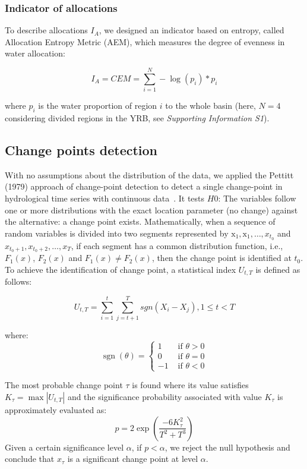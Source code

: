 \documentclass[draft]{../agujournal2019}
\begin{document}
	\subsubsection*{Indicator of allocations}
	To describe allocations $I_A$, we designed an indicator based on entropy, called Allocation Entropy Metric (AEM), which measures the degree of evenness in water allocation:

	\begin{equation}
		I_A = CEM = \sum_{i=1}^N - \log(p_{i}) * p_{i}
	\end{equation}

	where $p_{i}$ is the water proportion of region $i$ to the whole basin (here, $N=4$ considering divided regions in the YRB, see \textit{Supporting Information S1}).

	\subsection{Change points detection}
		With no assumptions about the distribution of the data, we applied the Pettitt (1979) approach of change-point detection to detect a single change-point in hydrological time series with continuous data~\cite{pettitt1979}.
		It tests $H0$: The variables follow one or more distributions with the exact location parameter (no change) against the alternative: a change point exists.
		Mathematically, when a sequence of random variables is divided into two segments represented by $\mathrm{x}_{1}, \mathrm{x}_{1}, \ldots, x_{t_{0}}$ and $x_{t_{0}+1}, x_{t_{0}+2}, \ldots, x_{T}$, if each segment has a common distribution function, i.e., $F_1(x)$, $F_2(x)$ and $F_1(x) \neq F_2(x)$, then the change point is identified at $t_0$. To achieve the identification of change point, a statistical index $U_{t,T}$ is defined as follows:

		\begin{equation}
			U_{t, T} = \sum_{i=1}^t\sum_{j=t+1}^T sgn(X_i - X_j), 1 \leq t < T
		\end{equation}

		where:
		\begin{equation}
			\operatorname{sgn}(\theta)= \begin{cases}1 & \text { if } \theta>0 \\ 0 & \text { if } \theta=0 \\ -1 & \text { if } \theta<0\end{cases}
		\end{equation}

		The most probable change point $\tau$ is found where its value satisfies $K_{\tau} = \max|U_{t, T}|$ and the significance probability associated with value $K_{\tau}$ is approximately evaluated as:
		\begin{equation}
			p=2 \exp \left(\frac{-6 K_{\tau}^{2}}{T^{2}+T^{3}}\right)
		\end{equation}
		Given a certain significance level $\alpha$, if $p < \alpha$, we reject the null hypothesis and conclude that $x_{\tau}$ is a significant change point at level $\alpha$.
\end{document}
